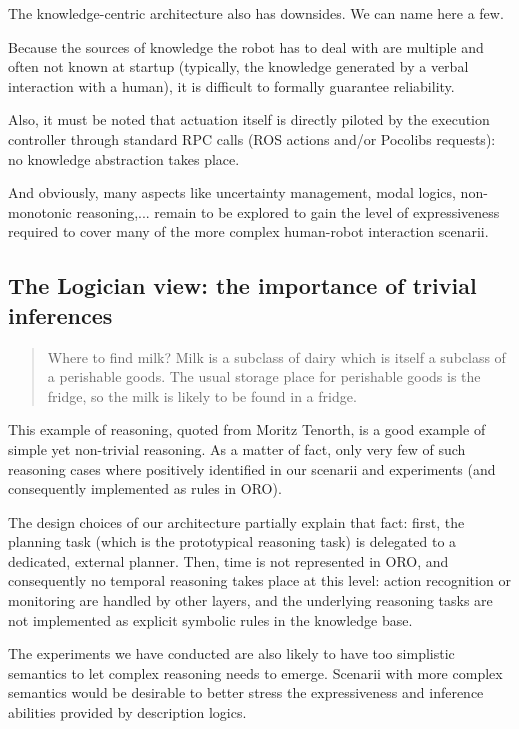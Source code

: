 \documentclass[letterpaper, 10 pt, conference]{ieeeconf}  %
\begin{document}
The knowledge-centric architecture also has downsides. We can name here a few.

Because the sources of knowledge the robot has to deal with are multiple and
often not known at startup (typically, the knowledge generated by a verbal
interaction with a human), it is difficult to formally guarantee reliability.

Also, it must be noted that actuation itself is directly piloted by the
execution controller through standard RPC calls (ROS actions and/or Pocolibs
requests): no knowledge abstraction takes place.

And obviously, many aspects like uncertainty management, modal logics,
non-monotonic reasoning,... remain to be explored to gain the level of
expressiveness required to cover many of the more complex human-robot
interaction scenarii.

\subsection{The Logician view: the importance of trivial inferences}

\begin{quote}

    Where to find milk? Milk is a subclass of dairy which is itself a subclass
    of a perishable goods. The usual storage place for perishable goods is the
    fridge, so the milk is likely to be found in a fridge.

\end{quote}

This example of reasoning, quoted from Moritz Tenorth, is a good example of
simple yet non-trivial reasoning. As a matter of fact, only very few of such
reasoning cases where positively identified in our scenarii and experiments
(and consequently implemented as rules in ORO).

The design choices of our architecture partially explain that fact: first, the
planning task (which is the prototypical reasoning task) is delegated to a
dedicated, external planner. Then, time is not represented in ORO, and
consequently no temporal reasoning takes place at this level: action
recognition or monitoring are handled by other layers, and the underlying
reasoning tasks are not implemented as explicit symbolic rules in the knowledge
base.

The experiments we have conducted are also likely to have too simplistic
semantics to let complex reasoning needs to emerge. Scenarii with more complex
semantics would be desirable to better stress the expressiveness and inference
abilities provided by description logics.
\end{document}
